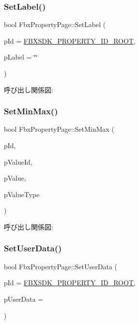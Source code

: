 \subsubsection{\texorpdfstring{Set\+Label()}{SetLabel()}}
{\footnotesize\ttfamily bool Fbx\+Property\+Page\+::\+Set\+Label (\begin{DoxyParamCaption}\item[{\hyperlink{fbxtypes_8h_a088fa96de3b0b3ea69f0f6afef525dfb}{Fbx\+Int}}]{p\+Id = {\ttfamily \hyperlink{fbxpropertydef_8h_a291bdb6d8428dce8463143fa3aba2c34}{F\+B\+X\+S\+D\+K\+\_\+\+P\+R\+O\+P\+E\+R\+T\+Y\+\_\+\+I\+D\+\_\+\+R\+O\+OT}},  }\item[{const char $\ast$}]{p\+Label = {\ttfamily \char`\"{}\char`\"{}} }\end{DoxyParamCaption})}

呼び出し関係図\+:
\mbox{\label{class_fbx_property_page_a806d74ac95a70a176c235368e939c1e2}} 
\subsubsection{\texorpdfstring{Set\+Min\+Max()}{SetMinMax()}}
{\footnotesize\ttfamily bool Fbx\+Property\+Page\+::\+Set\+Min\+Max (\begin{DoxyParamCaption}\item[{\hyperlink{fbxtypes_8h_a088fa96de3b0b3ea69f0f6afef525dfb}{Fbx\+Int}}]{p\+Id,  }\item[{\hyperlink{class_fbx_property_info_a83069f079a29bde133f2e9324de5af43}{Fbx\+Property\+Info\+::\+E\+Value\+Index}}]{p\+Value\+Id,  }\item[{const void $\ast$}]{p\+Value,  }\item[{\hyperlink{fbxpropertytypes_8h_a73913a5ddfb20e57c6f25e9e6784bd92}{E\+Fbx\+Type}}]{p\+Value\+Type }\end{DoxyParamCaption})}

呼び出し関係図\+:
\mbox{\label{class_fbx_property_page_a01bb449f90d1ade4b7c120f80dfdafea}} 
\subsubsection{\texorpdfstring{Set\+User\+Data()}{SetUserData()}}
{\footnotesize\ttfamily bool Fbx\+Property\+Page\+::\+Set\+User\+Data (\begin{DoxyParamCaption}\item[{\hyperlink{fbxtypes_8h_a088fa96de3b0b3ea69f0f6afef525dfb}{Fbx\+Int}}]{p\+Id = {\ttfamily \hyperlink{fbxpropertydef_8h_a291bdb6d8428dce8463143fa3aba2c34}{F\+B\+X\+S\+D\+K\+\_\+\+P\+R\+O\+P\+E\+R\+T\+Y\+\_\+\+I\+D\+\_\+\+R\+O\+OT}},  }\item[{const void $\ast$}]{p\+User\+Data = {} }\end{DoxyParamCaption})}

